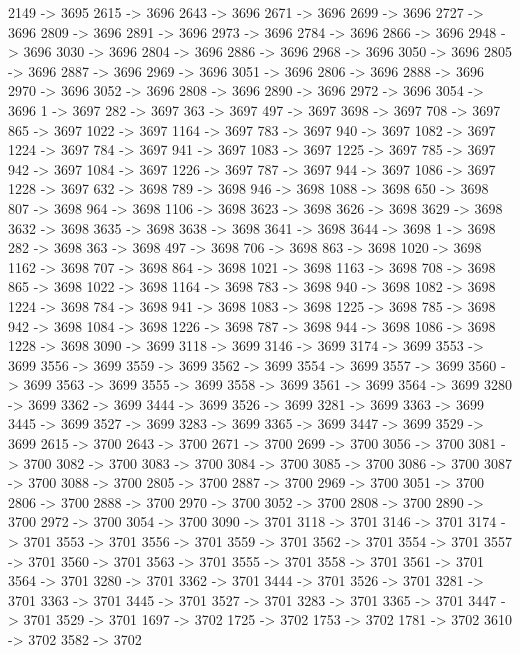 {	2149 -> 3695
	2615 -> 3696
	2643 -> 3696
	2671 -> 3696
	2699 -> 3696
	2727 -> 3696
	2809 -> 3696
	2891 -> 3696
	2973 -> 3696
	2784 -> 3696
	2866 -> 3696
	2948 -> 3696
	3030 -> 3696
	2804 -> 3696
	2886 -> 3696
	2968 -> 3696
	3050 -> 3696
	2805 -> 3696
	2887 -> 3696
	2969 -> 3696
	3051 -> 3696
	2806 -> 3696
	2888 -> 3696
	2970 -> 3696
	3052 -> 3696
	2808 -> 3696
	2890 -> 3696
	2972 -> 3696
	3054 -> 3696
	1 -> 3697
	282 -> 3697
	363 -> 3697
	497 -> 3697
	3698 -> 3697
	708 -> 3697
	865 -> 3697
	1022 -> 3697
	1164 -> 3697
	783 -> 3697
	940 -> 3697
	1082 -> 3697
	1224 -> 3697
	784 -> 3697
	941 -> 3697
	1083 -> 3697
	1225 -> 3697
	785 -> 3697
	942 -> 3697
	1084 -> 3697
	1226 -> 3697
	787 -> 3697
	944 -> 3697
	1086 -> 3697
	1228 -> 3697
	632 -> 3698
	789 -> 3698
	946 -> 3698
	1088 -> 3698
	650 -> 3698
	807 -> 3698
	964 -> 3698
	1106 -> 3698
	3623 -> 3698
	3626 -> 3698
	3629 -> 3698
	3632 -> 3698
	3635 -> 3698
	3638 -> 3698
	3641 -> 3698
	3644 -> 3698
	1 -> 3698
	282 -> 3698
	363 -> 3698
	497 -> 3698
	706 -> 3698
	863 -> 3698
	1020 -> 3698
	1162 -> 3698
	707 -> 3698
	864 -> 3698
	1021 -> 3698
	1163 -> 3698
	708 -> 3698
	865 -> 3698
	1022 -> 3698
	1164 -> 3698
	783 -> 3698
	940 -> 3698
	1082 -> 3698
	1224 -> 3698
	784 -> 3698
	941 -> 3698
	1083 -> 3698
	1225 -> 3698
	785 -> 3698
	942 -> 3698
	1084 -> 3698
	1226 -> 3698
	787 -> 3698
	944 -> 3698
	1086 -> 3698
	1228 -> 3698
	3090 -> 3699
	3118 -> 3699
	3146 -> 3699
	3174 -> 3699
	3553 -> 3699
	3556 -> 3699
	3559 -> 3699
	3562 -> 3699
	3554 -> 3699
	3557 -> 3699
	3560 -> 3699
	3563 -> 3699
	3555 -> 3699
	3558 -> 3699
	3561 -> 3699
	3564 -> 3699
	3280 -> 3699
	3362 -> 3699
	3444 -> 3699
	3526 -> 3699
	3281 -> 3699
	3363 -> 3699
	3445 -> 3699
	3527 -> 3699
	3283 -> 3699
	3365 -> 3699
	3447 -> 3699
	3529 -> 3699
	2615 -> 3700
	2643 -> 3700
	2671 -> 3700
	2699 -> 3700
	3056 -> 3700
	3081 -> 3700
	3082 -> 3700
	3083 -> 3700
	3084 -> 3700
	3085 -> 3700
	3086 -> 3700
	3087 -> 3700
	3088 -> 3700
	2805 -> 3700
	2887 -> 3700
	2969 -> 3700
	3051 -> 3700
	2806 -> 3700
	2888 -> 3700
	2970 -> 3700
	3052 -> 3700
	2808 -> 3700
	2890 -> 3700
	2972 -> 3700
	3054 -> 3700
	3090 -> 3701
	3118 -> 3701
	3146 -> 3701
	3174 -> 3701
	3553 -> 3701
	3556 -> 3701
	3559 -> 3701
	3562 -> 3701
	3554 -> 3701
	3557 -> 3701
	3560 -> 3701
	3563 -> 3701
	3555 -> 3701
	3558 -> 3701
	3561 -> 3701
	3564 -> 3701
	3280 -> 3701
	3362 -> 3701
	3444 -> 3701
	3526 -> 3701
	3281 -> 3701
	3363 -> 3701
	3445 -> 3701
	3527 -> 3701
	3283 -> 3701
	3365 -> 3701
	3447 -> 3701
	3529 -> 3701
	1697 -> 3702
	1725 -> 3702
	1753 -> 3702
	1781 -> 3702
	3610 -> 3702
	3582 -> 3702
}
